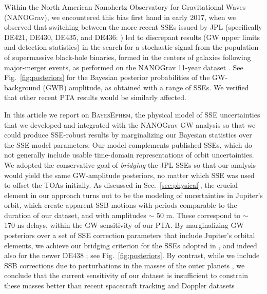 \documentclass{aastex63}
\begin{document}
Within the North American Nanohertz Observatory for Gravitational Waves (NANOGrav), we encountered this bias first hand in early 2017, when we observed that switching between the more recent SSEs issued by JPL (specifically DE421, DE430, DE435, and DE436: \citealt{2009IPNPR.178C...1F,2014IPNPR.196C...1F,de435,de436}) led to discrepant results (GW upper limits and detection statistics) in the search for a stochastic signal from the population of supermassive black-hole binaries, formed in the centers of galaxies following major-merger events, as performed on the NANOGrav 11-year dataset \citep{2018ApJS..235...37A,2018ApJ...859...47A}.
See Fig.\ \ref{fig:posteriors} for the Bayesian posterior probabilities of the GW-background (GWB) amplitude, as obtained with a range of SSEs. We verified that other recent PTA results \citep{2015Sci...349.1522S,2016ApJ...821...13A} would be similarly affected.

In this article we report on \textsc{BayesEphem}, the physical model of SSE uncertainties that we developed and integrated with the NANOGrav GW analysis so that we could produce SSE-robust results \citep{2018ApJ...859...47A} by marginalizing our Bayesian statistics over the SSE model parameters. 
Our model complements published SSEs, which do not generally include usable time-domain representations of orbit uncertainties.
We adopted the conservative goal of \emph{bridging} the JPL SSEs so that our analysis would yield the same GW-amplitude posteriors, no matter which SSE was used to offset the TOAs initially.
As discussed in Sec.\ \ref{sec:physical}, the crucial element in our approach turns out to be the modeling of uncertainties in Jupiter's orbit, which create apparent SSB motions with periods comparable to the duration of our dataset, and with amplitudes $\sim$ 50 m. These correspond to $\sim$ 170-ns delays, within the GW sensitivity of our PTA.
By marginalizing GW posteriors over a set of SSE correction parameters that include Jupiter's orbital elements, we achieve our bridging criterion for the SSEs adopted in \cite{2018ApJ...859...47A}, and indeed also for the newer DE438 \citep{de438}; see Fig.\ \ref{fig:posteriors}.
By contrast, while we include SSB corrections due to perturbations in the masses of the outer planets \citep{2010ApJ...720L.201C}, we conclude that the current sensitivity of our dataset is insufficient to constrain these masses better than recent spacecraft tracking and Doppler datasets \citep{jh+2000,2018MNRAS.481.5501C,2006AJ....132.2520J,2014AJ....148...76J,2009AJ....137.4322J}.
\end{document}
